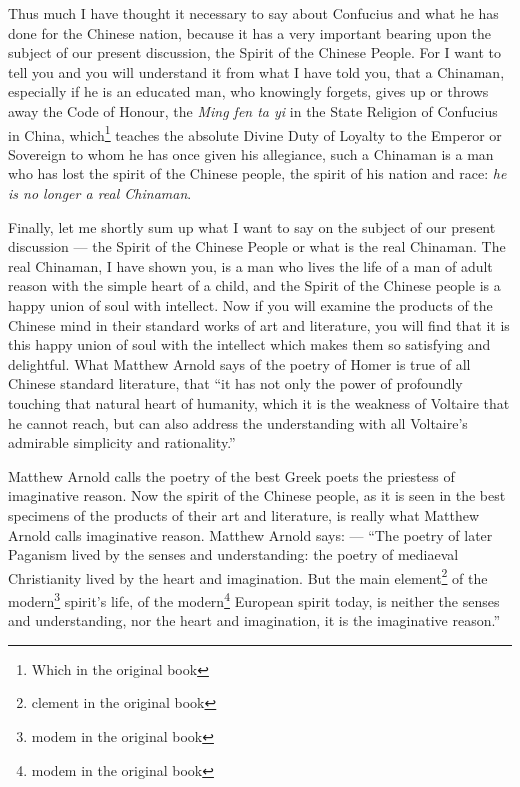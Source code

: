 Thus much I have thought it necessary to say about Confucius and what he has done for the Chinese nation, because it has a very important bearing upon the subject of our present discussion, the Spirit of the Chinese People.
For I want to tell you and you will understand it from what I have told you, that a Chinaman, especially if he is an educated man, who knowingly forgets, gives up or throws away the Code of Honour, the \emph{Ming fen ta yi} in the State Religion of Confucius in China, which\footnote{Which in the original book} teaches the absolute Divine Duty of Loyalty to the Emperor or Sovereign to whom he has once given his allegiance, such a Chinaman is a man who has lost the spirit of the Chinese people, the spirit of his nation and race: \emph{he is no longer a real Chinaman}.

Finally, let me shortly sum up what I want to say on the subject of our present discussion --- the Spirit of the Chinese People or what is the real Chinaman.
The real Chinaman, I have shown you, is a man who lives the life of a man of adult reason with the simple heart of a child, and the Spirit of the Chinese people is a happy union of soul with intellect.
Now if you will examine the products of the Chinese mind in their standard works of art and literature, you will find that it is this happy union of soul with the intellect which makes them so satisfying and delightful.
What Matthew Arnold says of the poetry of Homer is true of all Chinese standard literature, that ``it has not only the power of profoundly touching that natural heart of humanity, which it is the weakness of Voltaire that he cannot reach, but can also address the understanding with all Voltaire's admirable simplicity and rationality.''

Matthew Arnold calls the poetry of the best Greek poets the priestess of imaginative reason.
Now the spirit of the Chinese people, as it is seen in the best specimens of the products of their art and literature, is really what Matthew Arnold calls imaginative reason.
Matthew Arnold says: --- ``The poetry of later Paganism  lived by the senses and understanding: the poetry of mediaeval Christianity lived by the heart and imagination. But the main element\footnote{clement in the original book} of the modern\footnote{modem in the original book} spirit's life, of the modern\footnote{modem in the original book} European spirit today, is neither the senses and understanding, nor the heart and imagination, it is the imaginative reason.''

